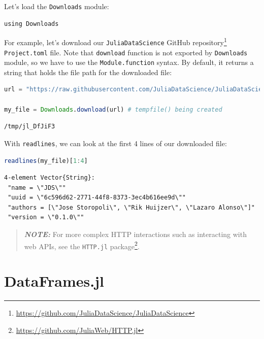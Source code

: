 \documentclass[
  notoc %
]{tufte-book}
\DeclareRobustCommand{\href}[2]{#2\footnote{\url{#1}}}
\newcommand{\passthrough}[1]{#1}
\begin{document}
Let's load the \passthrough{\lstinline!Downloads!} module:

\begin{lstlisting}
using Downloads
\end{lstlisting}

For example, let's download our
\href{https://github.com/JuliaDataScience/JuliaDataScience}{\passthrough{\lstinline!JuliaDataScience!}
GitHub repository} \passthrough{\lstinline!Project.toml!} file. Note
that \passthrough{\lstinline!download!} function is not exported by
\passthrough{\lstinline!Downloads!} module, so we have to use the
\passthrough{\lstinline!Module.function!} syntax. By default, it returns
a string that holds the file path for the downloaded file:

\begin{lstlisting}[language=Julia]
url = "https://raw.githubusercontent.com/JuliaDataScience/JuliaDataScience/main/Project.toml"

my_file = Downloads.download(url) # tempfile() being created
\end{lstlisting}

\begin{lstlisting}[language=Output]
/tmp/jl_DfJiF3
\end{lstlisting}

With \passthrough{\lstinline!readlines!}, we can look at the first 4
lines of our downloaded file:

\begin{lstlisting}[language=Julia]
readlines(my_file)[1:4]
\end{lstlisting}

\begin{lstlisting}[language=Output]
4-element Vector{String}:
 "name = \"JDS\""
 "uuid = \"6c596d62-2771-44f8-8373-3ec4b616ee9d\""
 "authors = [\"Jose Storopoli\", \"Rik Huijzer\", \"Lazaro Alonso\"]"
 "version = \"0.1.0\""
\end{lstlisting}

\begin{quote}
\textbf{\emph{NOTE:}} For more complex HTTP interactions such as
interacting with web APIs, see the
\href{https://github.com/JuliaWeb/HTTP.jl}{\passthrough{\lstinline!HTTP.jl!}
package}.
\end{quote}

\hypertarget{sec:dataframes}{%
\chapter{DataFrames.jl}\label{sec:dataframes}}
\end{document}
